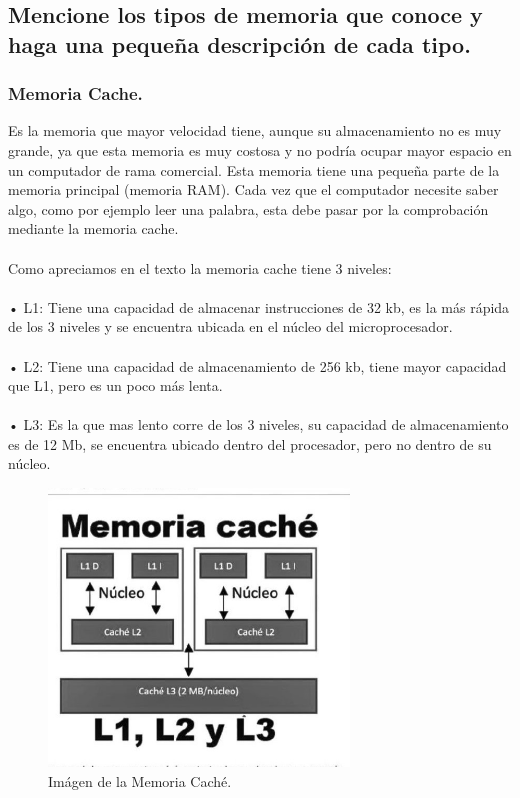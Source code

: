 \documentclass{article}
\begin{document}
\subsection{Mencione los tipos de memoria que conoce y haga una pequeña descripción de cada tipo.}
\paragraph{}
\subsubsection{Memoria Cache.}	
Es la memoria que mayor velocidad tiene, aunque su almacenamiento no es muy grande, ya que esta memoria es muy costosa y no podría ocupar mayor espacio en un computador de rama comercial. Esta memoria tiene una pequeña parte de la memoria principal (memoria RAM). Cada vez que el computador necesite saber algo, como por ejemplo leer una palabra, esta debe pasar por la comprobación mediante la memoria cache.
\paragraph{}
Como apreciamos en el texto\cite{texto} la memoria cache tiene 3 niveles:
\paragraph{}
•	L1: Tiene una capacidad de almacenar instrucciones de 32 kb, es la más rápida de los 3 niveles y se encuentra ubicada en el núcleo del microprocesador.
\paragraph{}
•	L2: Tiene una capacidad de almacenamiento de 256 kb, tiene mayor capacidad que L1, pero es un poco más lenta.
\paragraph{}
•	L3: Es la que mas lento corre de los 3 niveles, su capacidad de almacenamiento es de 12 Mb, se encuentra ubicado dentro del procesador, pero no dentro de su núcleo. 
\begin{figure}[h]
\includegraphics[width=8cm]{imagen2.jpg}
\centering
\caption{Imágen de la Memoria Caché. \cite{img2}}
\label{fig:imagen2}
\end{figure}
\end{document}
